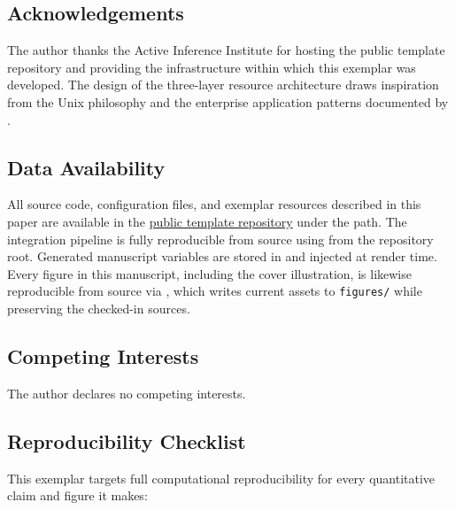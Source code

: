 \documentclass[
]{article}
\begin{document}
\subsection{Acknowledgements}\label{acknowledgements}

The author thanks the Active Inference Institute for hosting the public
template repository and providing the infrastructure within which this
exemplar was developed. The design of the three-layer resource
architecture draws inspiration from the Unix philosophy
\citep{Raymond2003art} and the enterprise application patterns
documented by \citep{Fowler2002patterns}.

\subsection{Data Availability}\label{data-availability}

All source code, configuration files, and exemplar resources described
in this paper are available in the
\href{https://github.com/docxology/template}{public template repository}
under the 
path. The integration pipeline is fully reproducible from source using
from the repository root. Generated manuscript variables are stored in
 and injected at render
time. Every figure in this manuscript, including the cover illustration,
is likewise reproducible from source via
,
which writes current assets to \texttt{figures/} while preserving the
checked-in  sources.

\subsection{Competing Interests}\label{competing-interests}

The author declares no competing interests.

\subsection{Reproducibility Checklist}\label{reproducibility-checklist}

This exemplar targets full computational reproducibility for every
quantitative claim and figure it makes:
\end{document}
